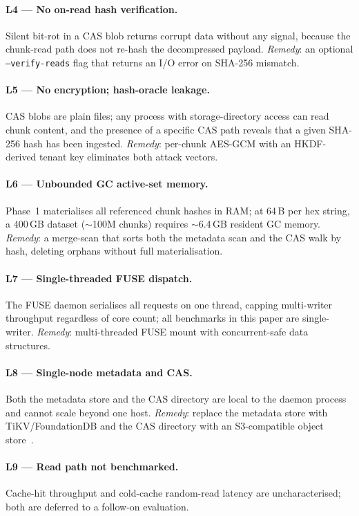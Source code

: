 \documentclass[5p,times]{elsarticle}
\begin{document}
\paragraph{L4 — No on-read hash verification.}
Silent bit-rot in a CAS blob returns corrupt data without any signal,
because the chunk-read path does not re-hash the decompressed payload.
\textit{Remedy}: an optional \texttt{--verify-reads} flag that returns
an I/O error on SHA-256 mismatch.

\paragraph{L5 — No encryption; hash-oracle leakage.}
CAS blobs are plain files; any process with storage-directory access
can read chunk content, and the presence of a specific CAS path reveals
that a given SHA-256 hash has been ingested.  \textit{Remedy}: per-chunk
AES-GCM with an HKDF-derived tenant key eliminates both attack vectors.

\paragraph{L6 — Unbounded GC active-set memory.}
Phase~1 materialises all referenced chunk hashes in RAM; at 64\,B per
hex string, a 400\,GB dataset ($\sim$100M chunks) requires $\sim$6.4\,GB
resident GC memory.  \textit{Remedy}: a merge-scan that sorts both the
metadata scan and the CAS walk by hash, deleting orphans without full
materialisation.

\paragraph{L7 — Single-threaded FUSE dispatch.}
The FUSE daemon serialises all requests on one thread, capping
multi-writer throughput regardless of core count; all benchmarks in this
paper are single-writer.  \textit{Remedy}: multi-threaded FUSE mount with
concurrent-safe data structures.

\paragraph{L8 — Single-node metadata and CAS.}
Both the metadata store and the CAS directory are local to the daemon
process and cannot scale beyond one host.  \textit{Remedy}: replace the
metadata store with TiKV/FoundationDB and the CAS directory with an
S3-compatible object store~\cite{weil2006ceph}.

\paragraph{L9 — Read path not benchmarked.}
Cache-hit throughput and cold-cache random-read latency are
uncharacterised; both are deferred to a follow-on evaluation.
\end{document}
